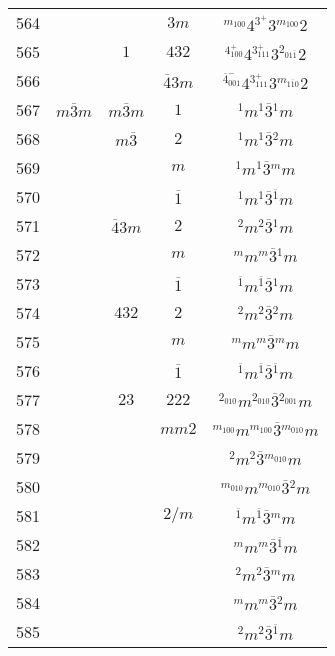 \begin{longtable}{ccccc}
  564 &  &  & $3m$ & ${}^{m_{100}} 4 {}^{3^{+}} 3 {}^{m_{100}} 2 $\\
  565 &  & $1$ & $432$ & ${}^{4^{+}_{100}} 4 {}^{3^{+}_{111}} 3 {}^{2_{01\overline{1}}} 2 $\\
  566 &  &  & $\overline{4}3m$ & ${}^{\overline{4}^{-}_{001}} 4 {}^{3^{+}_{111}} 3 {}^{m_{1\overline{1}0}} 2 $\\
  567 & $m\overline{3}m$ & $m\overline{3}m$ & $1$ & ${}^{1} m {}^{1} \overline{3} {}^{1} m $\\
  568 &  & $m\overline{3}$ & $2$ & ${}^{1} m {}^{1} \overline{3} {}^{2} m $\\
  569 &  &  & $m$ & ${}^{1} m {}^{1} \overline{3} {}^{m} m $\\
  570 &  &  & $\overline{1}$ & ${}^{1} m {}^{1} \overline{3} {}^{\overline{1}} m $\\
  571 &  & $\overline{4}3m$ & $2$ & ${}^{2} m {}^{2} \overline{3} {}^{1} m $\\
  572 &  &  & $m$ & ${}^{m} m {}^{m} \overline{3} {}^{1} m $\\
  573 &  &  & $\overline{1}$ & ${}^{\overline{1}} m {}^{\overline{1}} \overline{3} {}^{1} m $\\
  574 &  & $432$ & $2$ & ${}^{2} m {}^{2} \overline{3} {}^{2} m $\\
  575 &  &  & $m$ & ${}^{m} m {}^{m} \overline{3} {}^{m} m $\\
  576 &  &  & $\overline{1}$ & ${}^{\overline{1}} m {}^{\overline{1}} \overline{3} {}^{\overline{1}} m $\\
  577 &  & $23$ & $222$ & ${}^{2_{010}} m {}^{2_{010}} \overline{3} {}^{2_{001}} m $\\
  578 &  &  & $mm2$ & ${}^{m_{100}} m {}^{m_{100}} \overline{3} {}^{m_{010}} m $\\
  579 &  &  &  & ${}^{2} m {}^{2} \overline{3} {}^{m_{010}} m $\\
  580 &  &  &  & ${}^{m_{010}} m {}^{m_{010}} \overline{3} {}^{2} m $\\
  581 &  &  & $2/m$ & ${}^{\overline{1}} m {}^{\overline{1}} \overline{3} {}^{m} m $\\
  582 &  &  &  & ${}^{m} m {}^{m} \overline{3} {}^{\overline{1}} m $\\
  583 &  &  &  & ${}^{2} m {}^{2} \overline{3} {}^{m} m $\\
  584 &  &  &  & ${}^{m} m {}^{m} \overline{3} {}^{2} m $\\
  585 &  &  &  & ${}^{2} m {}^{2} \overline{3} {}^{\overline{1}} m $\\

\end{longtable}
